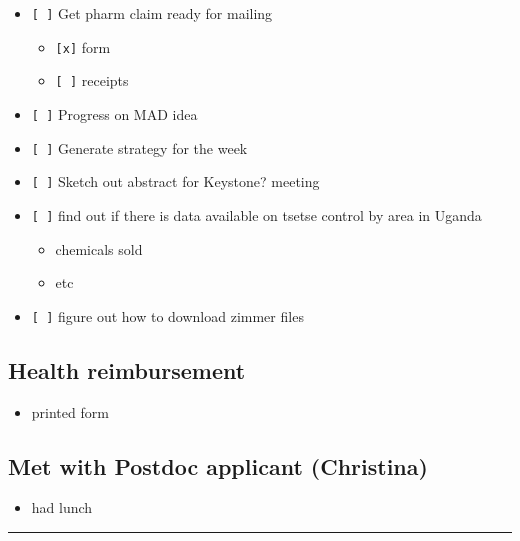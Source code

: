 \documentclass[letterpaper]{scrartcl}
\begin{document}
\begin{itemize}
\itemsep1pt\parskip0pt
\item
  \texttt{{[} {]}} Get pharm claim ready for mailing

  \begin{itemize}
  \itemsep1pt\parskip0pt
  \item
    \texttt{{[}x{]}} form
  \item
    \texttt{{[} {]}} receipts
  \end{itemize}
\item
  \texttt{{[} {]}} Progress on MAD idea
\item
  \texttt{{[} {]}} Generate strategy for the week
\item
  \texttt{{[} {]}} Sketch out abstract for Keystone? meeting
\item
  \texttt{{[} {]}} find out if there is data available on tsetse control
  by area in Uganda

  \begin{itemize}
  \itemsep1pt\parskip0pt
  \item
    chemicals sold
  \item
    etc
  \end{itemize}
\item
  \texttt{{[} {]}} figure out how to download zimmer files
\end{itemize}

\subsection{Health reimbursement}\label{health-reimbursement-1}

\begin{itemize}
\itemsep1pt\parskip0pt
\item
  printed form
\end{itemize}

\subsection{Met with Postdoc applicant
(Christina)}\label{met-with-postdoc-applicant-christina}

\begin{itemize}
\itemsep1pt\parskip0pt
\item
  had lunch
\end{itemize}

\begin{center}\rule{0.5\linewidth}{\linethickness}\end{center}
\end{document}
